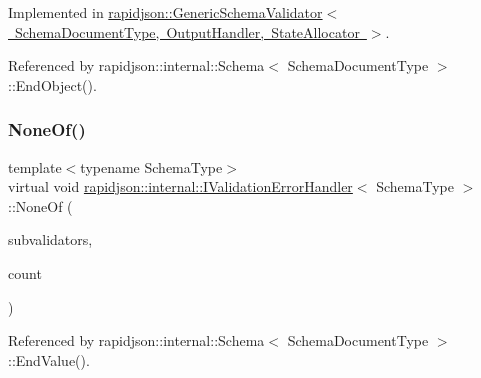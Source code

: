 Implemented in \mbox{\hyperlink{classrapidjson_1_1_generic_schema_validator_a981efd4aab86914496aa4f6f5b343c41}{rapidjson\+::\+Generic\+Schema\+Validator$<$ Schema\+Document\+Type, Output\+Handler, State\+Allocator $>$}}.



Referenced by rapidjson\+::internal\+::\+Schema$<$ Schema\+Document\+Type $>$\+::\+End\+Object().

\mbox{\label{classrapidjson_1_1internal_1_1_i_validation_error_handler_a533d091b8167450f24d66d11783b7d69}} 
\subsubsection{\texorpdfstring{NoneOf()}{NoneOf()}}
{\footnotesize\ttfamily template$<$typename Schema\+Type$>$ \\
virtual void \mbox{\hyperlink{classrapidjson_1_1internal_1_1_i_validation_error_handler}{rapidjson\+::internal\+::\+I\+Validation\+Error\+Handler}}$<$ Schema\+Type $>$\+::None\+Of (\begin{DoxyParamCaption}\item[{\mbox{\hyperlink{classrapidjson_1_1internal_1_1_i_schema_validator}{I\+Schema\+Validator}} $\ast$$\ast$}]{subvalidators,  }\item[{\mbox{\hyperlink{namespacerapidjson_a44eb33eaa523e36d466b1ced64b85c84}{Size\+Type}}}]{count }\end{DoxyParamCaption})\hspace{0.3cm}{\ttfamily [pure virtual]}}



Referenced by rapidjson\+::internal\+::\+Schema$<$ Schema\+Document\+Type $>$\+::\+End\+Value().

\mbox{\label{classrapidjson_1_1internal_1_1_i_validation_error_handler_a4764debbb404a581a4ed962d1ae769bb}} 

